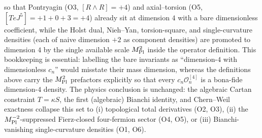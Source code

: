 \documentclass[aps,prd,twocolumn,superscriptaddress,showpacs,preprintnumbers,nofootinbib,longbibliography,floatfix]{revtex4-2}
\newcommand{\MPl}{M_{\rm Pl}}
\begin{document}
so that Pontryagin (O3, $[R\wedge R]=+4$) and axial--torsion
(O5, $[TeJ^5]=+1+0+3=+4$) already sit at dimension $4$ with a bare
dimensionless coefficient, while the Holst dual, Nieh--Yan, torsion-square,
and single-curvature densities (each of naive dimension $+2$ as component
densities) are promoted to dimension $4$ by the single available scale
$\MPl^{2}$ inside the operator definition. This bookkeeping is essential:
labelling the bare invariants as ``dimension-$4$ with dimensionless $c_n$''
would misstate their mass dimension, whereas the definitions above carry the
$\MPl^{2}$ prefactors explicitly so that every
$c_n\mathcal{O}_n^{[4]}$ is a bona-fide dimension-$4$ density. The physics
conclusion is unchanged: the algebraic Cartan constraint $T=\kappa S$, the
first (algebraic) Bianchi identity, and Chern--Weil exactness collapse this
set to (i) topological total derivatives (O2, O3), (ii) the
$\MPl^{-2}$-suppressed Fierz-closed four-fermion sector (O4, O5), or
(iii) Bianchi-vanishing single-curvature densities (O1, O6).
\end{document}
